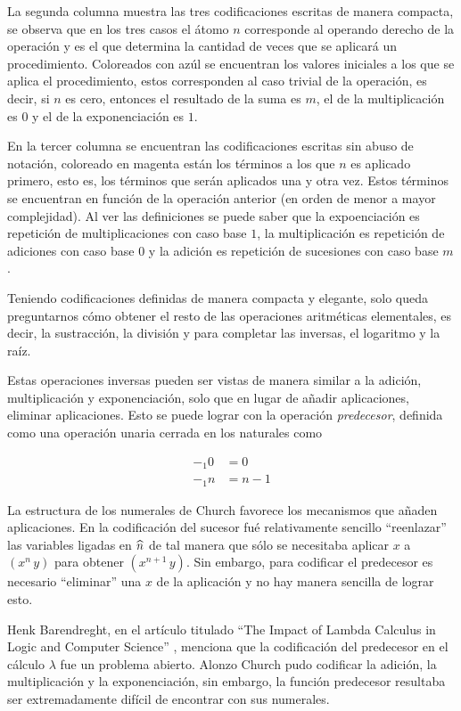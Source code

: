 La segunda columna muestra las tres codificaciones escritas de manera compacta, se observa que en los tres casos el átomo \( n \) corresponde al operando derecho de la operación y es el que determina la cantidad de veces que se aplicará un procedimiento. Coloreados con azúl se encuentran los valores iniciales a los que se aplica el procedimiento, estos corresponden al caso trivial de la operación, es decir, si \( n \) es cero, entonces el resultado de la suma es \( m \), el de la multiplicación es \( 0 \) y el de la exponenciación es \( 1 \).

En la tercer columna se encuentran las codificaciones escritas sin abuso de notación, coloreado en magenta están los términos a los que \( n \) es aplicado primero, esto es, los términos que serán aplicados una y otra vez. Estos términos se encuentran en función de la operación anterior (en orden de menor a mayor complejidad). Al ver las definiciones se puede saber que la expoenciación es repetición de multiplicaciones con caso base \( 1 \), la multiplicación es repetición de adiciones con caso base \( 0 \) y la adición es repetición de sucesiones con caso base \( m \).

Teniendo codificaciones definidas de manera compacta y elegante, solo queda preguntarnos cómo obtener el resto de las operaciones aritméticas elementales, es decir, la sustracción, la división y para completar las inversas, el logaritmo y la raíz.

Estas operaciones inversas pueden ser vistas de manera similar a la adición, multiplicación y exponenciación, solo que en lugar de añadir aplicaciones, eliminar aplicaciones. Esto se puede lograr con la operación \emph{predecesor}, definida como una operación unaria cerrada en los naturales como

\begin{align*}
  -_{1} 0 &= 0 \\
  -_{1} n &= n-1
\end{align*}

La estructura de los numerales de Church favorece los mecanismos que añaden aplicaciones. En la codificación del sucesor fué relativamente sencillo ``reenlazar'' las variables ligadas en \( \widehat{n} \) de tal manera que sólo se necesitaba aplicar \( x \) a \( (x^{n}\, y) \) para obtener \( (x^{n+1}\, y) \). Sin embargo, para codificar el predecesor es necesario ``eliminar'' una \( x \) de la aplicación y no hay manera sencilla de lograr esto.

Henk Barendreght, en el artículo titulado ``The Impact of Lambda Calculus in Logic and Computer Science'' \cite{Barendregt:Impact}, menciona que la codificación del predecesor en el cálculo \( λ \) fue un problema abierto. Alonzo Church pudo codificar la adición, la multiplicación y la exponenciación, sin embargo, la función predecesor resultaba ser extremadamente difícil de encontrar con sus numerales.

